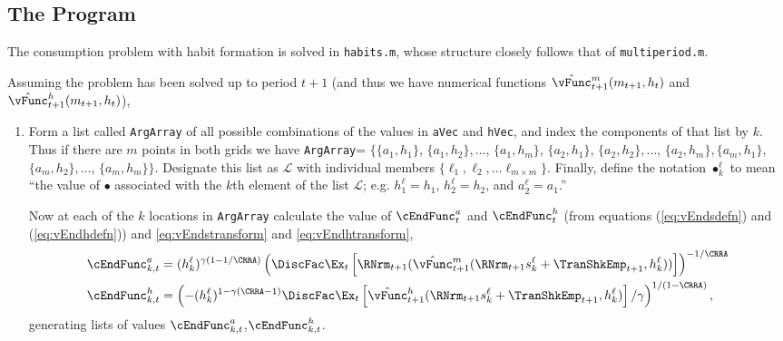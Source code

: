 \documentclass[titlepage, headings=optiontotocandhead]{\econtex}
\begin{document}
{  \hypertarget{The-Program}{}
  \subsection{The Program}
  The consumption problem with habit formation is solved in
  \texttt{habits.m}, whose structure closely follows that of
  \texttt{multiperiod.m}.

  Assuming the problem has been solved up to period $t+1$ (and thus we
  have numerical functions $\hat{\vFunc}_{t+1}^{m}({m}_{t+1},h_{t})$ and
  $\hat{\vFunc}_{t+1}^{h}({m}_{t+1},h_{t})$),
  \begin{enumerate}

  \item Form a list called \texttt{ArgArray} of all possible
    combinations of the values in \texttt{aVec} and
    \texttt{hVec}, and index the components of that list by $k$.  Thus
    if there are $m$ points in both grids we have \texttt{ArgArray}=
    $\{\{{a}_{1},h_{1}\}$, $\{{a}_{1},h_{2}\},\ldots$,
    $\{{a}_{1},h_{m}\}$, $\{{a}_{2},h_{1}\}$,
    $\{{a}_{2},h_{2}\},\ldots$, $\{{a}_{2},h_{m}\},
    \{{a}_{m},h_{1}\}$, $\{{a}_{m},h_{2}\},\ldots$,
    $\{{a}_{m},h_{m}\}\}$.  Designate this list as $\mathcal{L}$
    with individual members $\{\ell_{1}, \ell_{2}, \ldots \ell_{m \times
      m}\}$.  Finally, define the notation $\bullet^{\ell}_{k}$ to mean
    ``the value of $\bullet$ associated with the $k$th element of the
    list $\mathcal{L}$; e.g. $h^{\ell}_{1} = h_{1}$, $h^{\ell}_{2} =
    h_{2}$, and ${a}^{\ell}_{2}={a}_{1}$.''

    Now at each of the $k$ locations in \texttt{ArgArray} calculate the
    value of $\cEndFunc_{t}^{{a}}$ and $\cEndFunc_{t}^{h}$ (from
    equations (\ref{eq:vEndsdefn}) and (\ref{eq:vEndhdefn})) and
    \eqref{eq:vEndstransform} and \eqref{eq:vEndhtransform},
    \begin{equation}\begin{gathered}\begin{aligned}
          \cEndFunc_{k,t}^{{a}}  & = (h_{k}^{\ell})^{\gamma(1-1/\CRRA)}
          \left(\DiscFac \Ex_{t}
            \left[
              \RNrm_{t+1} (\hat{\vFunc}_{t+1}^{m}(\RNrm_{t+1} s^{\ell}_{k} +
              {\TranShkEmp}_{t+1},h^{\ell}_{k}))
            \right]
          \right)^{-1/\CRRA}
          \\      \cEndFunc_{k,t}^{h} 
          & =                                         \left(-(h_{k}^{\ell})^{1-\gamma(\CRRA-1)} \DiscFac \Ex_{t}
            \left[
              \hat{\vFunc}_{t+1}^{h}(\RNrm_{t+1} s^{\ell}_{k} +
              {\TranShkEmp}_{t+1},h^{\ell}_{k})
            \right]/\gamma
          \right)^{1/(1-\CRRA)},
        \end{aligned}\end{gathered}\end{equation}
    generating lists of values
    $\cEndFunc^{a}_{k,t}$,$\cEndFunc^{h}_{k,t}$.


\end{enumerate}}
\end{document}
